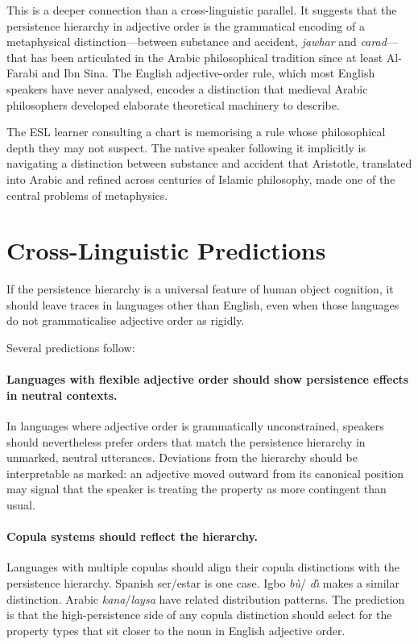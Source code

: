 \documentclass[11pt]{article}
\theoremstyle{rthm}
\theoremstyle{rdef}
\theoremstyle{remark}
\begin{document}
This is a deeper connection than a cross-linguistic parallel. It suggests
that the persistence hierarchy in adjective order is the grammatical
encoding of a metaphysical distinction---between substance and accident,
\textit{jawhar} and \textit{carad}---that has been articulated in the Arabic
philosophical tradition since at least Al-Farabi and Ibn Sina. The English
adjective-order rule, which most English speakers have never analysed, encodes
a distinction that medieval Arabic philosophers developed elaborate theoretical
machinery to describe.

The ESL learner consulting a chart is memorising a rule whose philosophical
depth they may not suspect. The native speaker following it implicitly is
navigating a distinction between substance and accident that Aristotle,
translated into Arabic and refined across centuries of Islamic philosophy,
made one of the central problems of metaphysics.

\section{Cross-Linguistic Predictions}
\label{sec:crossling}

If the persistence hierarchy is a universal feature of human object cognition,
it should leave traces in languages other than English, even when those
languages do not grammaticalise adjective order as rigidly.

Several predictions follow:

\paragraph{Languages with flexible adjective order should show persistence
effects in neutral contexts.}
In languages where adjective order is grammatically unconstrained, speakers
should nevertheless prefer orders that match the persistence hierarchy in
unmarked, neutral utterances. Deviations from the hierarchy should be
interpretable as marked: an adjective moved outward from its canonical
position may signal that the speaker is treating the property as more
contingent than usual.

\paragraph{Copula systems should reflect the hierarchy.}
Languages with multiple copulas should align their copula distinctions with
the persistence hierarchy. Spanish ser/estar is one case. Igbo \emph{b\`u}/
\emph{d\`\i{}} makes a similar distinction. Arabic \emph{kana}/\emph{laysa}
have related distribution patterns. The prediction is that the high-persistence
side of any copula distinction should select for the property types that sit
closer to the noun in English adjective order.
\end{document}
